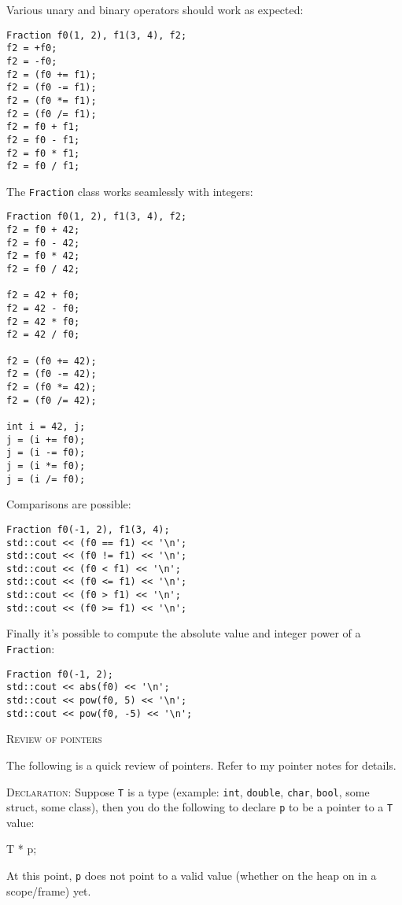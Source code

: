 Various unary and binary operators should work as expected:
\begin{Verbatim}[frame=single,fontsize=\footnotesize]
Fraction f0(1, 2), f1(3, 4), f2;
f2 = +f0;  
f2 = -f0;
f2 = (f0 += f1);
f2 = (f0 -= f1);
f2 = (f0 *= f1);
f2 = (f0 /= f1);
f2 = f0 + f1;  
f2 = f0 - f1;  
f2 = f0 * f1;  
f2 = f0 / f1;
\end{Verbatim}

The \verb!Fraction! class works seamlessly with integers:
\begin{Verbatim}[frame=single,fontsize=\footnotesize]
Fraction f0(1, 2), f1(3, 4), f2;
f2 = f0 + 42;
f2 = f0 - 42;
f2 = f0 * 42;
f2 = f0 / 42;

f2 = 42 + f0;
f2 = 42 - f0;
f2 = 42 * f0;
f2 = 42 / f0;

f2 = (f0 += 42);
f2 = (f0 -= 42);
f2 = (f0 *= 42);
f2 = (f0 /= 42);

int i = 42, j;
j = (i += f0);
j = (i -= f0);
j = (i *= f0);
j = (i /= f0);
\end{Verbatim}

Comparisons are possible:
\begin{Verbatim}[frame=single,fontsize=\footnotesize]
Fraction f0(-1, 2), f1(3, 4);
std::cout << (f0 == f1) << '\n';
std::cout << (f0 != f1) << '\n';
std::cout << (f0 < f1) << '\n';
std::cout << (f0 <= f1) << '\n';
std::cout << (f0 > f1) << '\n';
std::cout << (f0 >= f1) << '\n';
\end{Verbatim}

Finally it's possible to compute the absolute value
and integer power of a \texttt{Fraction}:
\begin{Verbatim}[frame=single,fontsize=\footnotesize]
Fraction f0(-1, 2);
std::cout << abs(f0) << '\n';
std::cout << pow(f0, 5) << '\n';
std::cout << pow(f0, -5) << '\n';
\end{Verbatim}


\newpage
\textsc{Review of pointers}

The following is a quick review of pointers.
Refer to my pointer notes for details.

\textsc{Declaration:}
Suppose \verb!T! is a type 
(example: \verb!int!, \verb!double!, \verb!char!, \verb!bool!, 
some struct, some class),
then you do the following to declare \verb!p! to be a pointer to a 
\verb!T! value:
\begin{console}[frame=single]
T * p;
\end{console}
At this point, \verb!p! does not point to a valid 
value (whether on the heap on in a scope/frame) yet.


